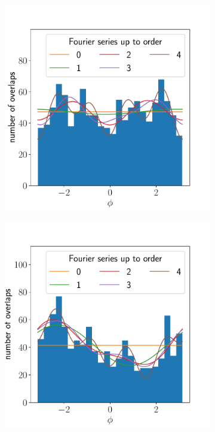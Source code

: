 \documentclass{article}
\begin{document}
\begin{figure}[ht]
\begin{subfigure}{0.24\linewidth}
		\caption{}
		\label{fig:isotropyhistvectra3edges}
	\end{subfigure}
	\begin{subfigure}{0.24\linewidth}
		\includegraphics[width=\linewidth]{isotropy-histogram-JHUVectra-2-edges}
		\caption{}
		\label{fig:isotropyhistvectra2edges}
	\end{subfigure}
	\begin{subfigure}{0.24\linewidth}
		\includegraphics[width=\linewidth]{isotropy-histogram-JHUVectra-1-edges}

\end{subfigure}
\end{figure}
\end{document}
